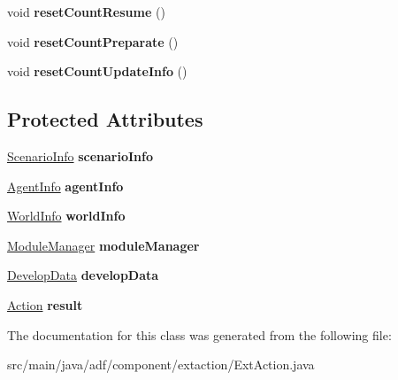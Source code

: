 \begin{DoxyCompactItemize}
\hypertarget{classadf_1_1component_1_1extaction_1_1ExtAction_aec14278468b22caf8ec9a8e865726ca3}{}\label{classadf_1_1component_1_1extaction_1_1ExtAction_aec14278468b22caf8ec9a8e865726ca3} 
void {\bfseries reset\+Count\+Resume} ()
\item 
\hypertarget{classadf_1_1component_1_1extaction_1_1ExtAction_a44438cee2777f74e41225cc8711b4dbc}{}\label{classadf_1_1component_1_1extaction_1_1ExtAction_a44438cee2777f74e41225cc8711b4dbc} 
void {\bfseries reset\+Count\+Preparate} ()
\item 
\hypertarget{classadf_1_1component_1_1extaction_1_1ExtAction_ae6d1f7c8d3e354ad221454139c9ef2bb}{}\label{classadf_1_1component_1_1extaction_1_1ExtAction_ae6d1f7c8d3e354ad221454139c9ef2bb} 
void {\bfseries reset\+Count\+Update\+Info} ()
\end{DoxyCompactItemize}
\subsection*{Protected Attributes}
\begin{DoxyCompactItemize}
\item 
\hypertarget{classadf_1_1component_1_1extaction_1_1ExtAction_a6fbc25311a85d78fa3f49e9264d657b8}{}\label{classadf_1_1component_1_1extaction_1_1ExtAction_a6fbc25311a85d78fa3f49e9264d657b8} 
\hyperlink{classadf_1_1agent_1_1info_1_1ScenarioInfo}{Scenario\+Info} {\bfseries scenario\+Info}
\item 
\hypertarget{classadf_1_1component_1_1extaction_1_1ExtAction_a06db73f1d9fffdf42af9fccae0a6e2d1}{}\label{classadf_1_1component_1_1extaction_1_1ExtAction_a06db73f1d9fffdf42af9fccae0a6e2d1} 
\hyperlink{classadf_1_1agent_1_1info_1_1AgentInfo}{Agent\+Info} {\bfseries agent\+Info}
\item 
\hypertarget{classadf_1_1component_1_1extaction_1_1ExtAction_a641f11ee5304c24ffabcc452830261e7}{}\label{classadf_1_1component_1_1extaction_1_1ExtAction_a641f11ee5304c24ffabcc452830261e7} 
\hyperlink{classadf_1_1agent_1_1info_1_1WorldInfo}{World\+Info} {\bfseries world\+Info}
\item 
\hypertarget{classadf_1_1component_1_1extaction_1_1ExtAction_a9d41b6d5cf350972b6b6dd9343162cfe}{}\label{classadf_1_1component_1_1extaction_1_1ExtAction_a9d41b6d5cf350972b6b6dd9343162cfe} 
\hyperlink{classadf_1_1agent_1_1module_1_1ModuleManager}{Module\+Manager} {\bfseries module\+Manager}
\item 
\hypertarget{classadf_1_1component_1_1extaction_1_1ExtAction_a628aa58b77cb5ec94fe56f6f20f6c019}{}\label{classadf_1_1component_1_1extaction_1_1ExtAction_a628aa58b77cb5ec94fe56f6f20f6c019} 
\hyperlink{classadf_1_1agent_1_1develop_1_1DevelopData}{Develop\+Data} {\bfseries develop\+Data}
\item 
\hypertarget{classadf_1_1component_1_1extaction_1_1ExtAction_a10762c84b9058147d4e9e4813a4f6466}{}\label{classadf_1_1component_1_1extaction_1_1ExtAction_a10762c84b9058147d4e9e4813a4f6466} 
\hyperlink{classadf_1_1agent_1_1action_1_1Action}{Action} {\bfseries result}
\end{DoxyCompactItemize}


The documentation for this class was generated from the following file\+:\begin{DoxyCompactItemize}
\item 
src/main/java/adf/component/extaction/Ext\+Action.\+java\end{DoxyCompactItemize}
